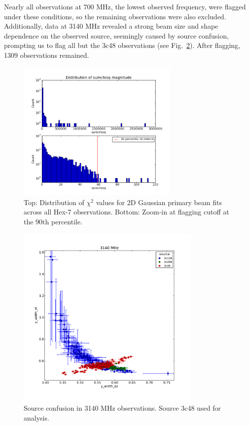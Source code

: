 \documentclass[preprint]{aastex}
\begin{document}
Nearly all observations at 700 MHz, the lowest observed frequency,
were flagged under these conditions, so the remaining observations
were also excluded.  Additionally, data at 3140 MHz revealed a strong
beam size and shape dependence on the observed source, seemingly
caused by source confusion, prompting us to flag all but the 3c48
observations (see Fig.~\ref{fig.source_confusion}).  After flagging,
1309 observations remained.

\begin{figure}[htb]
\begin{center}
\includegraphics[width=0.7\textwidth]{images/dist_sumchisq}
\caption{Top: Distribution of $\chi^2$ values for 2D Gaussian primary
  beam fits across all Hex-7 observations.  Bottom: Zoom-in at
  flagging cutoff at the 90$\textrm{th}$
  percentile. \label{fig.dist_sumchisq}}
\end{center}
\end{figure}

\begin{figure}[htb]
\begin{center}
\includegraphics[width=0.8\textwidth]{images/source_confusion}
\caption{Source confusion in 3140 MHz observations.  Source 3c48 used
  for analysis. \label{fig.source_confusion}}
\end{center}
\end{figure}
\end{document}
